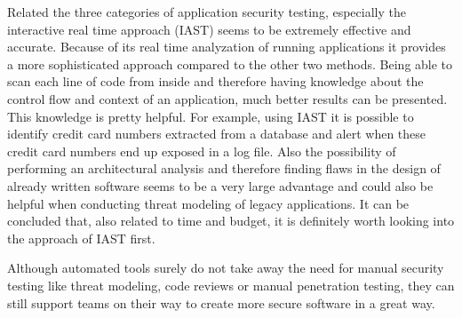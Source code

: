 \documentclass[conference]{IEEEtran}
\begin{document}
Related the three categories of application security testing, especially the interactive real time approach (IAST) seems to be extremely effective and accurate. Because of its real time analyzation of running applications it provides a more sophisticated approach compared to the other two methods. Being able to scan each line of code from inside and therefore having knowledge about the control flow and context of an application, much better results can be presented. This knowledge is pretty helpful. For example, using IAST it is possible to identify credit card numbers extracted from a database and alert when these credit card numbers end up exposed in a log file. Also the possibility of performing an architectural analysis and therefore finding flaws in the design of already written software seems to be a very large advantage and could also be helpful when conducting threat modeling of legacy applications. It can be concluded that, also related to time and budget, it is definitely worth looking into the approach of IAST first.

Although automated tools surely do not take away the need for manual security testing like threat modeling, code reviews or manual penetration testing, they can still support teams on their way to create more secure software in a great way.




\end{document}
